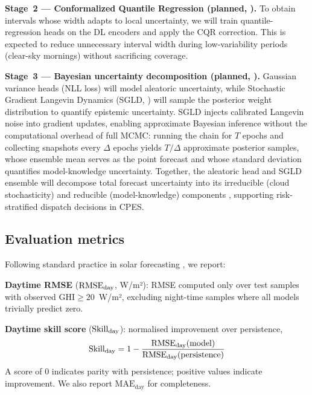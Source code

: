 \textbf{Stage~2 --- Conformalized Quantile Regression (planned, \cite{romano2019}).}
To obtain intervals whose width adapts to local uncertainty, we will train
quantile-regression heads on the DL encoders and apply the CQR correction.
This is expected to reduce unnecessary interval width during low-variability
periods (clear-sky mornings) without sacrificing coverage.

\textbf{Stage~3 --- Bayesian uncertainty decomposition (planned,
\cite{kendall2017,welling2011}).}
Gaussian variance heads (NLL loss) will model aleatoric uncertainty, while
Stochastic Gradient Langevin Dynamics (SGLD, \cite{welling2011}) will sample
the posterior weight distribution to quantify epistemic uncertainty.
SGLD injects calibrated Langevin noise into gradient updates, enabling
approximate Bayesian inference without the computational overhead of full
MCMC: running the chain for $T$ epochs and collecting snapshots every
$\Delta$ epochs yields $T/\Delta$ approximate posterior samples, whose
ensemble mean serves as the point forecast and whose standard deviation
quantifies model-knowledge uncertainty.
Together, the aleatoric head and SGLD ensemble will decompose total forecast
uncertainty into its irreducible (cloud stochasticity) and reducible
(model-knowledge) components \cite{kendall2017}, supporting risk-stratified
dispatch decisions in CPES.

\subsection{Evaluation metrics}

Following standard practice in solar forecasting \cite{coimbra2013}, we report:

\textbf{Daytime RMSE} ($\text{RMSE}_\text{day}$, W/m²): RMSE computed only over test samples
with observed $\text{GHI} \geq 20$~W/m², excluding night-time samples where all
models trivially predict zero.

\textbf{Daytime skill score} ($\text{Skill}_\text{day}$): normalised improvement over persistence,
\begin{equation}
  \text{Skill}_\text{day} = 1 - \frac{\text{RMSE}_\text{day}(\text{model})}{\text{RMSE}_\text{day}(\text{persistence})}
  \label{eq:skill}
\end{equation}
A score of 0 indicates parity with persistence; positive values indicate improvement.
We also report $\text{MAE}_\text{day}$ for completeness.